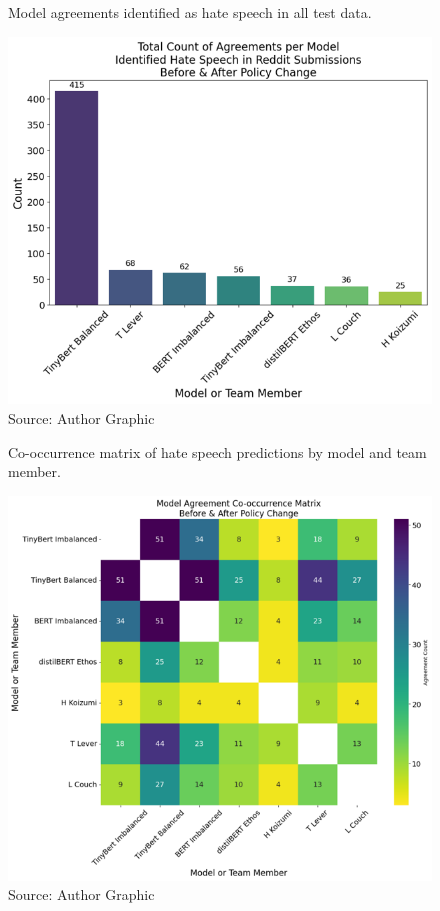 \documentclass[conference]{IEEEtran}
\begin{document}
\begin{figure}
    \centering
    \caption{Model agreements identified as hate speech in all test data.}
    \label{fig:agreement}
    \includegraphics[scale=.7]{ModelTeam1.png}
    \caption*{Source: Author Graphic}
\end{figure}
\begin{figure}
    \centering
    \caption{Co-occurrence matrix of hate speech predictions by model and team member.}
    \label{fig:matrix}
    \includegraphics[scale=.7]{ModelTeam2.png}
    \caption*{Source: Author Graphic}
\end{figure}
\end{document}
